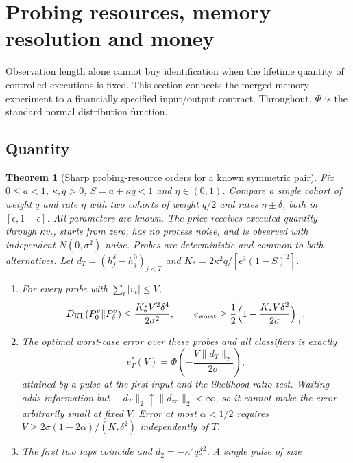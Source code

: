 \documentclass[12pt]{article}
\newtheorem{theorem}{Theorem}[section]
\theoremstyle{definition}
\theoremstyle{remark}
\newcommand{\KL}{D_{\mathrm{KL}}}
\begin{document}
\section{Probing resources, memory resolution and money}\label{sec:resources}

Observation length alone cannot buy identification when the lifetime quantity of controlled executions is fixed. This section connects the merged-memory experiment to a financially specified input/output contract. Throughout, $\Phi$ is the standard normal distribution function.

\subsection{Quantity}

\begin{theorem}[Sharp probing-resource orders for a known symmetric pair]\label{thm:quantity}
Fix $0\le a<1$, $\kappa,q>0$, $S=a+\kappa q<1$ and $\eta\in(0,1)$. Compare a single cohort of weight $q$ and rate $\eta$ with two cohorts of weight $q/2$ and rates $\eta\pm\delta$, both in $[\epsilon,1-\epsilon]$. All parameters are known. The price receives executed quantity through $\kappa v_t$, starts from zero, has no process noise, and is observed with independent $N(0,\sigma^2)$ noise. Probes are deterministic and common to both alternatives. Let $d_T=(h^\delta_j-h^0_j)_{j<T}$ and $K_*=2\kappa^2q/[\epsilon^3(1-S)^2]$.
\begin{enumerate}[label=(\roman*)]
\item For every probe with $\sum_t|v_t|\le V$,
\begin{equation}\label{eq:klV}
\KL(P_0^v\|P_\delta^v)\le\frac{K_*^2V^2\delta^4}{2\sigma^2},\qquad e_{\rm worst}\ge\frac12\Bigl(1-\frac{K_*V\delta^2}{2\sigma}\Bigr)_+ .
\end{equation}
\item The optimal worst-case error over these probes and all classifiers is exactly
\begin{equation}\label{eq:exacterr}
e^*_T(V)=\Phi\!\left(-\frac{V\|d_T\|_2}{2\sigma}\right),
\end{equation}
attained by a pulse at the first input and the likelihood-ratio test. Waiting adds information but $\|d_T\|_2\uparrow\|d_\infty\|_2<\infty$, so it cannot make the error arbitrarily small at fixed $V$. Error at most $\alpha<1/2$ requires $V\ge2\sigma(1-2\alpha)/(K_*\delta^2)$ independently of $T$.
\item The first two taps coincide and $d_2=-\kappa^2q\delta^2$. A single pulse of size

\end{enumerate}
\end{theorem}
\end{document}
